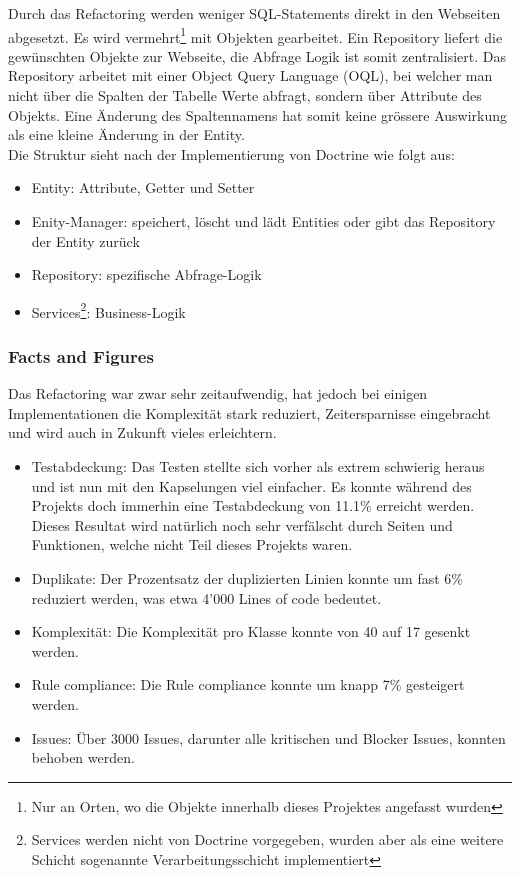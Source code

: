 \FloatBarrier
Durch das Refactoring werden weniger SQL-Statements direkt in den Webseiten abgesetzt. Es wird vermehrt\footnote{Nur an Orten, wo die Objekte innerhalb dieses Projektes angefasst wurden} mit Objekten gearbeitet. Ein Repository liefert die gewünschten Objekte zur Webseite, die Abfrage Logik ist somit zentralisiert. Das Repository arbeitet mit einer Object Query Language (OQL), bei welcher man nicht über die Spalten der Tabelle Werte abfragt, sondern über Attribute des Objekts. Eine Änderung des Spaltennamens hat somit keine grössere Auswirkung als eine kleine Änderung in der Entity.\\

Die Struktur sieht nach der Implementierung von Doctrine wie folgt aus:
\begin{itemize}
\item Entity: Attribute, Getter und Setter
\item Enity-Manager: speichert, löscht und lädt Entities oder gibt das Repository der Entity zurück
\item Repository: spezifische Abfrage-Logik
\item Services\footnote{Services werden nicht von Doctrine vorgegeben, wurden aber als eine weitere Schicht sogenannte Verarbeitungsschicht implementiert}: Business-Logik
\end{itemize}

\newpage
\subsubsection{Facts and Figures}
Das Refactoring war zwar sehr zeitaufwendig, hat jedoch bei einigen Implementationen die Komplexität stark reduziert, Zeitersparnisse eingebracht und wird auch in Zukunft vieles erleichtern.
\begin{itemize}
\item Testabdeckung: Das Testen stellte sich vorher als extrem schwierig heraus und ist nun mit den Kapselungen viel einfacher. Es konnte während des Projekts doch immerhin eine Testabdeckung von 11.1\% erreicht werden. Dieses Resultat wird natürlich noch sehr verfälscht durch Seiten und Funktionen, welche nicht Teil dieses Projekts waren.
\item Duplikate: Der Prozentsatz der duplizierten Linien konnte um fast 6\% reduziert werden, was etwa 4'000 Lines of code bedeutet.
\item Komplexität: Die Komplexität pro Klasse konnte von 40 auf 17 gesenkt werden.
\item Rule compliance: Die Rule compliance konnte um knapp 7\% gesteigert werden.
\item Issues: Über 3000 Issues, darunter alle kritischen und Blocker Issues, konnten behoben werden.
\end{itemize}


